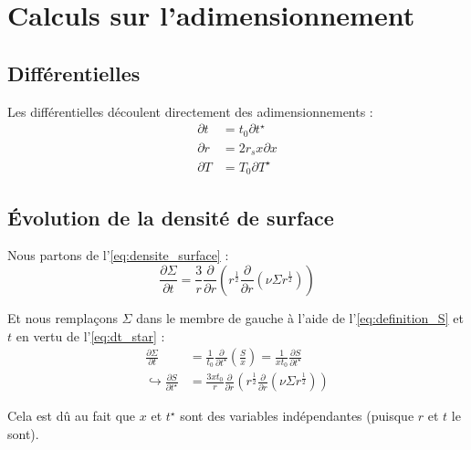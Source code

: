 \section{Calculs sur l’adimensionnement}
\label{app:adimensionnement}

\subsection{Différentielles}

Les différentielles découlent directement des adimensionnements :
\begin{subequations}
    \begin{align}
        \label{eq:dt_star}
        \partial t &= t_0 \partial t^{\star} \\
        \label{eq:dr_star}
        \partial r &= 2 r_s x \partial x \\
        \label{eq:dT_star}
        \partial T &= T_0 \partial T^{\star}
    \end{align}
\end{subequations}

\subsection{Évolution de la densité de surface}

Nous partons de l’\cref{eq:densite_surface} :
\begin{equation}
    \frac{\partial \Sigma}{\partial t} = \frac{3}{r} \frac{\partial}{\partial r} \left( r^\frac{1}{2} \frac{\partial}{\partial r} \left( \nu \Sigma r^\frac{1}{2} \right) \right)
\end{equation}

Et nous remplaçons $\Sigma$ dans le membre de gauche à l’aide de
l’\cref{eq:definition_S} et $t$ en vertu de l’\cref{eq:dt_star} :
\begin{align}
    \frac{\partial \Sigma}{\partial t} &= \frac{1}{t_0} \frac{\partial}{\partial t^\star} \left( \frac{S}{x} \right) = \frac{1}{x t_0} \frac{\partial S}{\partial t^\star} \\
    \hookrightarrow \frac{\partial S}{\partial t^\star} &= \frac{3 x t_0}{r} \frac{\partial}{\partial r} \left( r^\frac{1}{2} \frac{\partial}{\partial r} \left( \nu \Sigma r^\frac{1}{2} \right) \right)
\end{align}

Cela est dû au fait que $x$ et $t^\star$ sont des variables indépendantes
(puisque $r$ et $t$ le sont).

